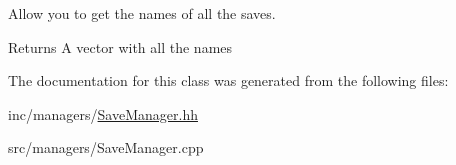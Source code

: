 Allow you to get the names of all the saves. 

\begin{DoxyReturn}{Returns}
A vector with all the names 
\end{DoxyReturn}


The documentation for this class was generated from the following files\+:\begin{DoxyCompactItemize}
\item 
inc/managers/\hyperlink{SaveManager_8hh}{Save\+Manager.\+hh}\item 
src/managers/Save\+Manager.\+cpp\end{DoxyCompactItemize}
